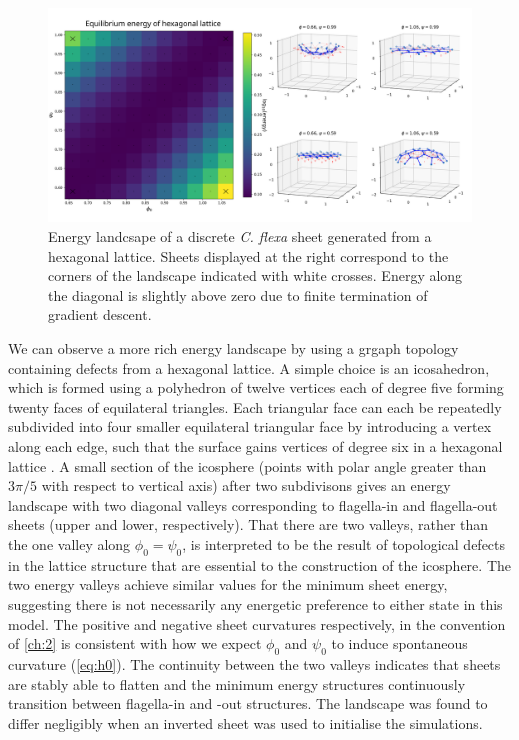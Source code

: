 \begin{figure}
	\centering
	\includegraphics[width=\textwidth]{landscape_hex.png}
	\caption[Energy landscape of a discrete \textit{C. flexa} sheet generated from a hexagonal lattice]{Energy landcsape of a discrete \textit{C. flexa} sheet generated from a hexagonal lattice. Sheets displayed at the right correspond to the corners of the landscape indicated with white crosses. Energy along the diagonal is slightly above zero due to finite termination of gradient descent.}
	\label{fig:landscape_flat}
\end{figure}

We can observe a more rich energy landscape by using a grgaph topology containing defects from a hexagonal lattice.
A simple choice is an icosahedron, which is formed using a polyhedron of twelve vertices each of degree five forming twenty faces of equilateral triangles.
Each triangular face can each be repeatedly subdivided into four smaller equilateral triangular face by introducing a vertex along each edge, such that the surface gains vertices of degree six in a hexagonal lattice \citep{dahl2014}.
A small section of the icosphere (points with polar angle greater than $3\pi/5$ with respect to vertical axis) after two subdivisons gives an energy landscape with two diagonal valleys corresponding to flagella-in and flagella-out sheets (upper and lower, respectively).
That there are two valleys, rather than the one valley along $\phi_0 = \psi_0$, is interpreted to be the result of topological defects in the lattice structure that are essential to the construction of the icosphere. 
The two energy valleys achieve similar values for the minimum sheet energy, suggesting there is not necessarily any energetic preference to either state in this model.
The positive and negative sheet curvatures respectively, in the convention of \cref{ch:2} is consistent with how we expect $\phi_0$ and $\psi_0$ to induce spontaneous curvature (\cref{eq:h0}).
The continuity between the two valleys indicates that sheets are stably able to flatten and the minimum energy structures continuously transition between flagella-in and -out structures. 
The landscape was found to differ negligibly when an inverted sheet was used to initialise the simulations.

